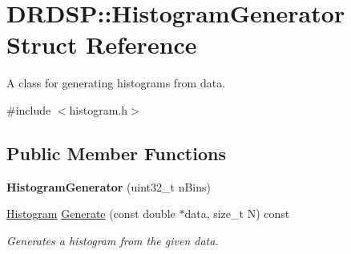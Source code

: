 \hypertarget{struct_d_r_d_s_p_1_1_histogram_generator}{\section{D\-R\-D\-S\-P\-:\-:Histogram\-Generator Struct Reference}
\label{struct_d_r_d_s_p_1_1_histogram_generator}
}


A class for generating histograms from data.  




{\ttfamily \#include $<$histogram.\-h$>$}

\subsection*{Public Member Functions}
\begin{DoxyCompactItemize}
\item 
\hypertarget{struct_d_r_d_s_p_1_1_histogram_generator_ad8a1d610f8fb2ca15b3765d54e13885e}{{\bfseries Histogram\-Generator} (uint32\-\_\-t n\-Bins)}\label{struct_d_r_d_s_p_1_1_histogram_generator_ad8a1d610f8fb2ca15b3765d54e13885e}

\item 
\hypertarget{struct_d_r_d_s_p_1_1_histogram_generator_af1acac305990b01bc4cc6e612415bf72}{\hyperlink{struct_d_r_d_s_p_1_1_histogram}{Histogram} \hyperlink{struct_d_r_d_s_p_1_1_histogram_generator_af1acac305990b01bc4cc6e612415bf72}{Generate} (const double $\ast$data, size\-\_\-t N) const }\label{struct_d_r_d_s_p_1_1_histogram_generator_af1acac305990b01bc4cc6e612415bf72}

\begin{DoxyCompactList}\small\item\em Generates a histogram from the given data. \end{DoxyCompactList}\end{DoxyCompactItemize}
